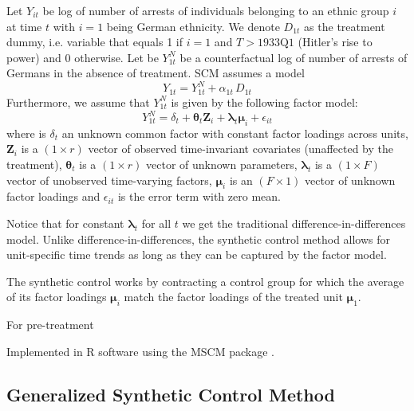 Let $Y_{it}$ be log of number of arrests of individuals belonging to an ethnic group $i$ at time $t$ with $i = 1$ being German ethnicity.  We
denote $D_{1t}$ as the treatment dummy, i.e. variable that equals 1 if $i = 1$ and $T > \text{1933Q1}$ (Hitler's rise to power) and 0 otherwise. 
Let be $Y_{1t}^N$ be a counterfactual log of number of arrests of Germans in the absence of treatment. SCM assumes a model
\begin{equation}
    Y_{1t} = Y_{1t}^N + \alpha_{1t} \, D_{1t}
\end{equation}
Furthermore, we assume that $Y_{1t}^N$ is given by the following factor model:
\begin{equation}
   Y_{1t}^N = \delta_t + \boldsymbol{\theta}_t \boldsymbol{Z}_i +
   \boldsymbol{\lambda}_t \boldsymbol{\mu}_i + \epsilon_{it}
\end{equation}
where is $\delta_t$ an unknown common factor with constant factor
loadings across units, $\boldsymbol{Z}_i$ is a
$(1 \times r)$ vector of observed time-invariant covariates (unaffected by the treatment),  $\boldsymbol{\theta}_t$ is a $(1 \times r)$ vector of
unknown parameters, $\boldsymbol{\lambda}_t$ is a $(1 \times F)$ vector of unobserved time-varying factors, $\boldsymbol{\mu}_i$ is an $(F \times 1)$ vector of unknown factor loadings
and $\epsilon_{it}$ is the error term with zero mean. 

Notice that for constant  $\boldsymbol{\lambda}_t$ for all $t$ we get the traditional  difference-in-differences model. Unlike difference-in-differences,  the synthetic control method  allows for unit-specific time trends as long as they can be captured by the factor model. 

The synthetic control works by contracting a control group for which the average of its factor loadings $\boldsymbol{\mu}_i$ match the factor loadings of the treated unit  $\boldsymbol{\mu}_1$.

For pre-treatment

Implemented in R software using the MSCM package \citep{becker_fast_2018}.
\subsection{Generalized Synthetic Control Method}
\citet{xu_generalized_2017}